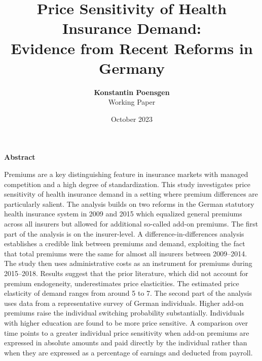\documentclass[a4paper, 11pt, english]{article}
\begin{document}
	
	
	\vspace{2em}

	\title{Price Sensitivity of Health Insurance Demand: \\ \vspace{-10pt} Evidence from Recent Reforms in Germany}
	\author{\textbf{Konstantin Poensgen} \\ Working Paper}
	\date{October 2023}
	\maketitle
	\thispagestyle{empty}

\vspace{2em}

\begin{center}
	\textbf{Abstract}
\end{center}

\begin{addmargin}[1.5em]{1.5em}
	\noindent Premiums are a key distinguishing feature in insurance markets with managed competition and a high degree of standardization. This study investigates price sensitivity of health insurance demand in a setting where premium differences are particularly salient. The analysis builds on two reforms in the German statutory health insurance system in 2009 and 2015 which equalized general premiums across all insurers but allowed for additional so-called add-on premiums.
	The first part of the analysis is on the insurer-level. A difference-in-differences analysis establishes a credible link between premiums and demand, exploiting the fact that total premiums were the same for almost all insurers between 2009--2014. The study then uses administrative costs as an instrument for premiums during 2015--2018. Results suggest that the prior literature, which did not account for premium endogeneity, underestimates price elasticities. The estimated price elasticity of demand ranges from around 5 to 7. 
	The second part of the analysis uses data from a representative survey of German individuals. Higher add-on premiums raise the individual switching probability substantially. Individuals with higher education are found to be more price sensitive. 
	A comparison over time points to a greater individual price sensitivity when add-on premiums are expressed in absolute amounts and paid directly by the individual rather than when they are expressed as a percentage of earnings and deducted from payroll.
\end{addmargin}
\end{document}
